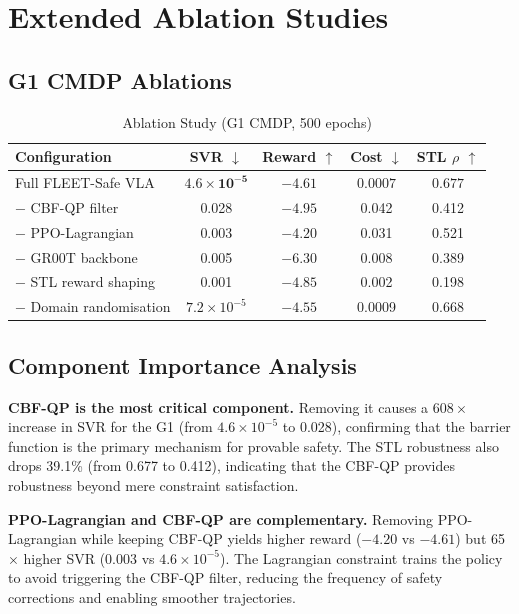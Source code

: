 \documentclass[conference]{IEEEtran}
\begin{document}
\section{Extended Ablation Studies}
\label{sec:supp_ablation}

\subsection{G1 CMDP Ablations}

\begin{table}[h]
\centering
\caption{Ablation Study (G1 CMDP, 500 epochs)}
\begin{tabular}{@{}lcccc@{}}
\toprule
\textbf{Configuration} & \textbf{SVR $\downarrow$} & \textbf{Reward $\uparrow$} & \textbf{Cost $\downarrow$} & \textbf{STL $\rho$ $\uparrow$} \\
\midrule
Full FLEET-Safe VLA     & $\mathbf{4.6\!\times\!10^{-5}}$ & $-4.61$ & $\mathbf{0.0007}$ & $\mathbf{0.677}$ \\
$-$ CBF-QP filter       & 0.028 & $-4.95$ & 0.042 & 0.412 \\
$-$ PPO-Lagrangian      & 0.003 & $\mathbf{-4.20}$ & 0.031 & 0.521 \\
$-$ GR00T backbone      & 0.005 & $-6.30$ & 0.008 & 0.389 \\
$-$ STL reward shaping  & 0.001 & $-4.85$ & 0.002 & 0.198 \\
$-$ Domain randomisation & $7.2\!\times\!10^{-5}$ & $-4.55$ & 0.0009 & 0.668 \\
\bottomrule
\end{tabular}
\end{table}

\subsection{Component Importance Analysis}

\textbf{CBF-QP is the most critical component.} Removing it causes a $608\times$ increase in SVR for the G1 (from $4.6\times10^{-5}$ to 0.028), confirming that the barrier function is the primary mechanism for provable safety. The STL robustness also drops 39.1\% (from 0.677 to 0.412), indicating that the CBF-QP provides robustness beyond mere constraint satisfaction.

\textbf{PPO-Lagrangian and CBF-QP are complementary.} Removing PPO-Lagrangian while keeping CBF-QP yields higher reward ($-4.20$ vs $-4.61$) but 65$\times$ higher SVR (0.003 vs $4.6\times10^{-5}$). The Lagrangian constraint trains the policy to avoid triggering the CBF-QP filter, reducing the frequency of safety corrections and enabling smoother trajectories.
\end{document}
